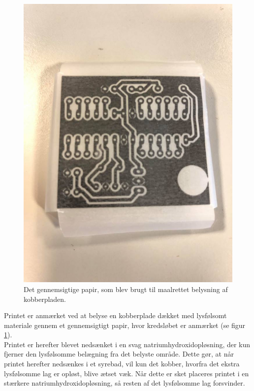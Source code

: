 \begin{figure}[H]
\centering
\includegraphics[scale=0.4]{Billeder/Printpapir.jpg}
\caption{ Det gennemsigtige papir, som blev brugt til maalrettet belysning af kobberpladen.}
\label{fig:mikrocontrollerprint}
\end{figure}


Printet er anmærket ved at belyse en kobberplade dækket med lysfølsomt materiale gennem et gennemsigtigt papir, hvor kredsløbet er anmærket (se figur \ref{fig:mikrocontrollerprint}).\\


Printet er herefter blevet nedsænket i en svag natriumhydroxidopløsning, der kun fjerner den lysfølsomme belægning fra det belyste område. Dette gør, at når printet herefter nedsænkes i et syrebad, vil kun det kobber, hvorfra det ekstra lysfølsomme lag er opløst, blive ætset væk. Når dette er sket placeres printet i en stærkere natriumhydroxidopløsning, så resten af det lysfølsomme lag forsvinder. 






